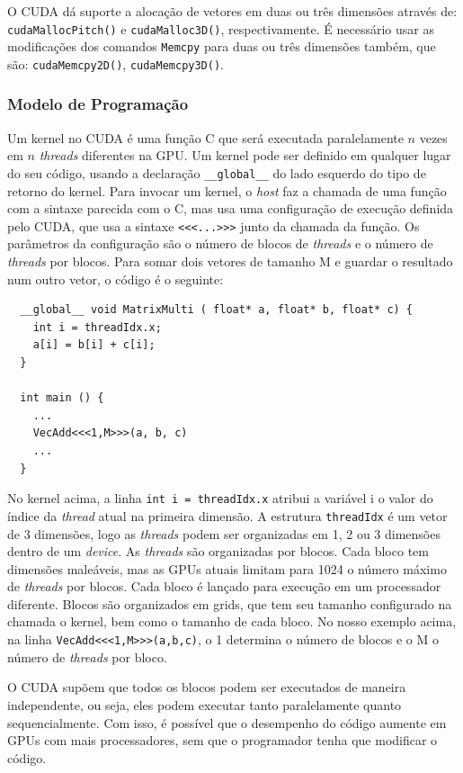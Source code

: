 O CUDA dá suporte a alocação de vetores em duas ou três dimensões através de: \verb#cudaMallocPitch()# e
\verb#cudaMalloc3D()#, respectivamente. É necessário usar as modificações dos comandos \verb#Memcpy# para
duas ou três dimensões também, que são: \verb#cudaMemcpy2D()#, \verb#cudaMemcpy3D()#.

\subsubsection{Modelo de Programação}
Um kernel no CUDA é uma função C que será executada paralelamente $n$ vezes em $n$ \textit{threads} diferentes na GPU. Um kernel pode ser
definido em qualquer lugar do seu código, usando a declaração \verb#__global__# do lado esquerdo do tipo de retorno do kernel.
Para invocar um kernel, o \textit{host} faz a chamada de uma função com a sintaxe parecida com o C, mas usa uma configuração de
execução definida pelo CUDA, que usa a sintaxe \verb#<<<...>>># junto da chamada da função. Os parâmetros da configuração são
o número de blocos de \textit{threads} e o número de \textit{threads} por blocos. Para somar dois vetores de tamanho M e guardar o resultado num
outro vetor, o código é o seguinte:

\begin{lstlisting}
  __global__ void MatrixMulti ( float* a, float* b, float* c) {
    int i = threadIdx.x;
    a[i] = b[i] + c[i];
  }

  int main () {
    ...
    VecAdd<<<1,M>>>(a, b, c)
    ...
  }
\end{lstlisting}

No kernel acima, a linha \verb#int i = threadIdx.x# atribui a variável i o valor do índice da \textit{thread} atual na primeira dimensão.
A estrutura \verb#threadIdx# é um vetor de 3 dimensões, logo as \textit{threads} podem ser organizadas em 1, 2 ou 3 dimensões dentro de um
\textit{device}. As \textit{threads} são organizadas por blocos. Cada bloco tem dimensões maleáveis, mas as GPUs atuais limitam para 1024 o
número máximo de \textit{threads} por blocos. Cada bloco é lançado para execução em um processador diferente. Blocos são organizados em
grids, que tem seu tamanho configurado na chamada o kernel, bem como o tamanho de cada bloco. No nosso exemplo acima, na linha
\verb#VecAdd<<<1,M>>>(a,b,c)#, o 1 determina o número de blocos e o M o número de \textit{threads} por bloco.

O CUDA supõem que todos os blocos podem ser executados de maneira independente, ou seja, eles podem executar tanto paralelamente
quanto sequencialmente. Com isso, é possível que o desempenho do código aumente em GPUs com mais processadores, sem que o programador
tenha que modificar o código.

